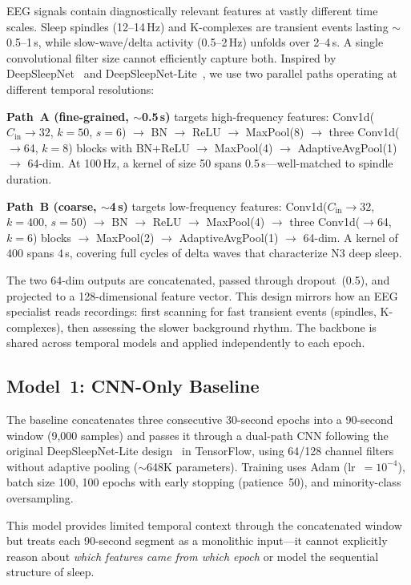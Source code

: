 \documentclass[final]{article}
\begin{document}
EEG signals contain diagnostically relevant features at vastly different time scales. Sleep spindles (12--14\,Hz) and K-complexes are transient events lasting $\sim$0.5--1\,s, while slow-wave/delta activity (0.5--2\,Hz) unfolds over 2--4\,s. A single convolutional filter size cannot efficiently capture both. Inspired by DeepSleepNet~\cite{Supratak2017} and DeepSleepNet-Lite~\cite{Fiorillo2019, DSLOriginalRepo}, we use two parallel paths operating at different temporal resolutions:

\textbf{Path~A (fine-grained, $\sim$0.5\,s)} targets high-frequency features: Conv1d($C_{\text{in}} \!\to\! 32$, $k\!=\!50$, $s\!=\!6$) $\to$ BN $\to$ ReLU $\to$ MaxPool(8) $\to$ three Conv1d($\to$64, $k\!=\!8$) blocks with BN+ReLU $\to$ MaxPool(4) $\to$ AdaptiveAvgPool(1) $\to$ 64-dim. At 100\,Hz, a kernel of size 50 spans 0.5\,s---well-matched to spindle duration.

\textbf{Path~B (coarse, $\sim$4\,s)} targets low-frequency features: Conv1d($C_{\text{in}} \!\to\! 32$, $k\!=\!400$, $s\!=\!50$) $\to$ BN $\to$ ReLU $\to$ MaxPool(4) $\to$ three Conv1d($\to$64, $k\!=\!6$) blocks $\to$ MaxPool(2) $\to$ AdaptiveAvgPool(1) $\to$ 64-dim. A kernel of 400 spans 4\,s, covering full cycles of delta waves that characterize N3 deep sleep.

The two 64-dim outputs are concatenated, passed through dropout~(0.5), and projected to a 128-dimensional feature vector. This design mirrors how an EEG specialist reads recordings: first scanning for fast transient events (spindles, K-complexes), then assessing the slower background rhythm. The backbone is shared across temporal models and applied independently to each epoch.

\subsection{Model~1: CNN-Only Baseline}

The baseline concatenates three consecutive 30-second epochs into a 90-second window (9,000 samples) and passes it through a dual-path CNN following the original DeepSleepNet-Lite design~\cite{Fiorillo2019} in TensorFlow, using 64/128 channel filters without adaptive pooling ($\sim$648K parameters). Training uses Adam (lr~$= 10^{-4}$), batch size 100, 100 epochs with early stopping (patience~50), and minority-class oversampling.

This model provides limited temporal context through the concatenated window but treats each 90-second segment as a monolithic input---it cannot explicitly reason about \emph{which features came from which epoch} or model the sequential structure of sleep.
\end{document}
